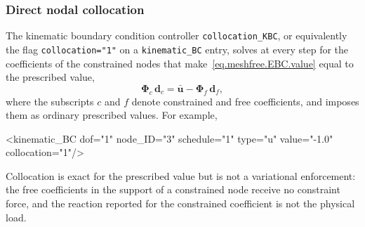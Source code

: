 \subsubsection{Direct nodal collocation}
The kinematic boundary condition controller \texttt{collocation\_KBC}, or equivalently the flag
\texttt{collocation="1"} on a \texttt{kinematic\_BC} entry, solves at every step for the
coefficients of the constrained nodes that make~\eqref{eq.meshfree.EBC.value} equal to the
prescribed value,
\begin{equation}
\mathbf{\Phi}_{c}\,\mathbf{d}_{c} = \bar{\mathbf{u}} - \mathbf{\Phi}_{f}\,\mathbf{d}_{f},
\end{equation}
where the subscripts $c$ and $f$ denote constrained and free coefficients, and imposes them as
ordinary prescribed values. For example,
\begin{inputfile}
<kinematic_BC dof="1" node_ID="3" schedule="1" type="u"
              value="-1.0" collocation="1"/>
\end{inputfile}
Collocation is exact for the prescribed value but is not a variational enforcement: the free
coefficients in the support of a constrained node receive no constraint force, and the reaction
reported for the constrained coefficient is not the physical load.

